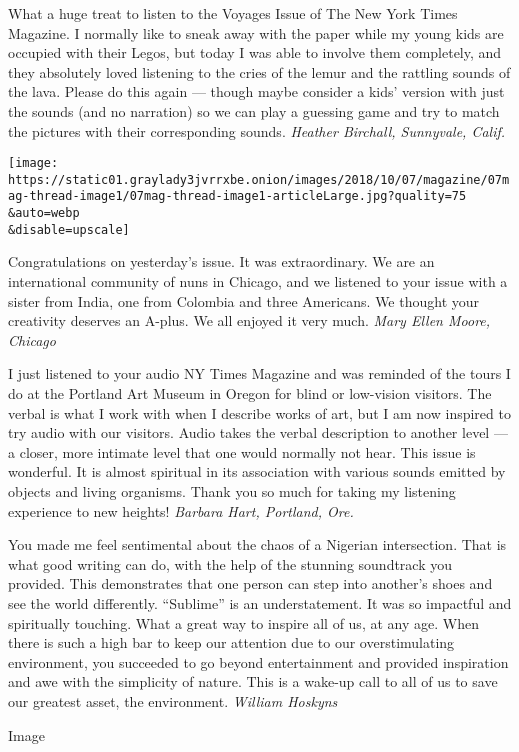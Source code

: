 What a huge treat to listen to the Voyages Issue of The New York Times
Magazine. I normally like to sneak away with the paper while my young
kids are occupied with their Legos, but today I was able to involve them
completely, and they absolutely loved listening to the cries of the
lemur and the rattling sounds of the lava. Please do this again ---
though maybe consider a kids' version with just the sounds (and no
narration) so we can play a guessing game and try to match the pictures
with their corresponding sounds. \emph{Heather Birchall, Sunnyvale,
Calif.}

\texttt{[image: https://static01.graylady3jvrrxbe.onion/images/2018/10/07/magazine/07mag-thread-image1/07mag-thread-image1-articleLarge.jpg?quality=75\\\&auto=webp\\\&disable=upscale]}

Congratulations on yesterday's issue. It was extraordinary. We are an
international community of nuns in Chicago, and we listened to your
issue with a sister from India, one from Colombia and three Americans.
We thought your creativity deserves an A-plus. We all enjoyed it very
much. \emph{Mary Ellen Moore, Chicago}

I just listened to your audio NY Times Magazine and was reminded of the
tours I do at the Portland Art Museum in Oregon for blind or low-vision
visitors. The verbal is what I work with when I describe works of art,
but I am now inspired to try audio with our visitors. Audio takes the
verbal description to another level --- a closer, more intimate level
that one would normally not hear. This issue is wonderful. It is almost
spiritual in its association with various sounds emitted by objects and
living organisms. Thank you so much for taking my listening experience
to new heights! \emph{Barbara Hart, Portland, Ore.}

You made me feel sentimental about the chaos of a Nigerian intersection.
That is what good writing can do, with the help of the stunning
soundtrack you provided. This demonstrates that one person can step into
another's shoes and see the world differently. ``Sublime'' is an
understatement. It was so impactful and spiritually touching. What a
great way to inspire all of us, at any age. When there is such a high
bar to keep our attention due to our overstimulating environment, you
succeeded to go beyond entertainment and provided inspiration and awe
with the simplicity of nature. This is a wake-up call to all of us to
save our greatest asset, the environment. \emph{William Hoskyns}

Image

